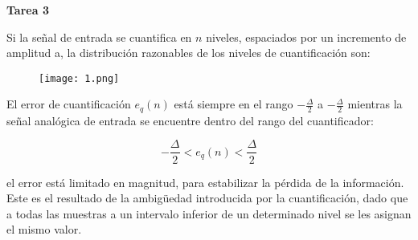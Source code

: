 \begin{center}
	\textbf{\Huge Tarea 3}
\end{center}


Si la señal de entrada se cuantifica en $n$ niveles, espaciados por un incremento de amplitud a, la distribución razonables de los niveles de cuantificación son:

\begin{figure} [!htbp]
	\centering
	\texttt{[image: 1.png]}
\end{figure} 

El error de cuantificación $e_{q}(n)$ está siempre en el rango $-\frac{\Delta}{2}$ a $- \frac{\Delta}{2}$ mientras la señal analógica de entrada se encuentre dentro del rango del cuantificador:

\begin{equation}
	- \frac{\Delta}{2} < e_q(n) < \frac{\Delta}{2}
\end{equation}

el error está limitado en magnitud, para estabilizar la pérdida de la información. Este es el resultado de la ambigüedad introducida por la cuantificación, dado que a todas las muestras a un intervalo inferior de un determinado nivel se les asignan el mismo valor. \\

